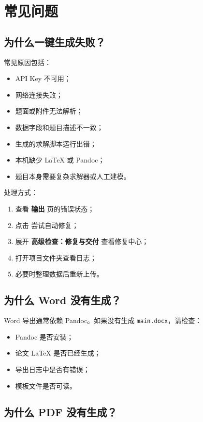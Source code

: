 \documentclass[UTF8,a4paper,12pt]{ctexart}
\newcommand{\button}[1]{\fbox{\textsf{#1}}}
\newcommand{\menu}[1]{\textbf{#1}}
\begin{document}
\section{常见问题}

\subsection{为什么一键生成失败？}

常见原因包括：

\begin{itemize}
  \item API Key 不可用；
  \item 网络连接失败；
  \item 题面或附件无法解析；
  \item 数据字段和题目描述不一致；
  \item 生成的求解脚本运行出错；
  \item 本机缺少 LaTeX 或 Pandoc；
  \item 题目本身需要复杂求解器或人工建模。
\end{itemize}

处理方式：

\begin{enumerate}
  \item 查看 \menu{输出} 页的错误状态；
  \item 点击 \button{继续} 尝试自动修复；
  \item 展开 \menu{高级检查：修复与交付} 查看修复中心；
  \item 打开项目文件夹查看日志；
  \item 必要时整理数据后重新上传。
\end{enumerate}

\subsection{为什么 Word 没有生成？}

Word 导出通常依赖 Pandoc。如果没有生成 \texttt{main.docx}，请检查：

\begin{itemize}
  \item Pandoc 是否安装；
  \item 论文 LaTeX 是否已经生成；
  \item 导出日志中是否有错误；
  \item 模板文件是否可读。
\end{itemize}

\subsection{为什么 PDF 没有生成？}
\end{document}
